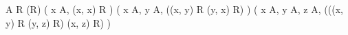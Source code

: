 
\hypertarget{def-set-relation-equivalence}{}
\begin{definition}
\TerForall A \colon \Set
\TerForall R \colon {}
(R) \coloneqq \left( \forall x \colon A, (x, x) \in R \right) \TermConjunction \left( \forall x \colon A, \forall y \colon A, ((x, y) \in R \Rightarrow (y, x) \in R) \right) \TermConjunction \left( \forall x \colon A, \forall y \colon A, \forall z \colon A, (((x, y) \in R \land (y, z) \in R) \Rightarrow (x, z) \in R) \right)
\end{definition}